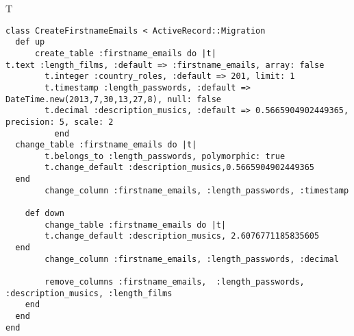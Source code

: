 T
\begin{verbatim}
class CreateFirstnameEmails < ActiveRecord::Migration
  def up
	  create_table :firstname_emails do |t|
t.text :length_films, :default => :firstname_emails, array: false
		t.integer :country_roles, :default => 201, limit: 1
		t.timestamp :length_passwords, :default => DateTime.new(2013,7,30,13,27,8), null: false
		t.decimal :description_musics, :default => 0.5665904902449365, precision: 5, scale: 2
		  end
  change_table :firstname_emails do |t|
		t.belongs_to :length_passwords, polymorphic: true
 		t.change_default :description_musics,0.5665904902449365
  end
 		change_column :firstname_emails, :length_passwords, :timestamp
   
	def down
		change_table :firstname_emails do |t|
		t.change_default :description_musics, 2.6076771185835605
  end
 		change_column :firstname_emails, :length_passwords, :decimal
   
		remove_columns :firstname_emails,  :length_passwords, :description_musics, :length_films 
    end 
  end
end

\end{verbatim}
